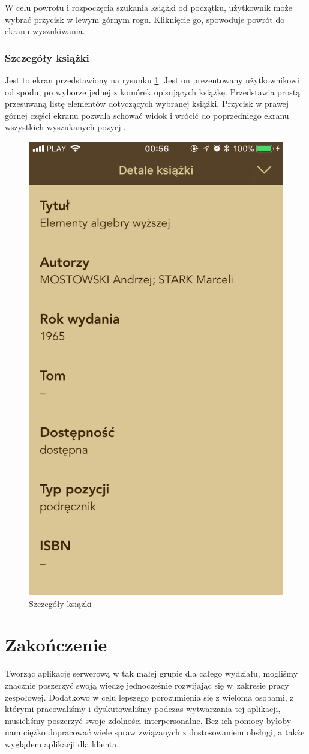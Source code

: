 \documentclass[twoside]{projektInzynierskiMS}
\begin{document}
W celu powrotu i rozpoczęcia szukania książki od początku, użytkownik może wybrać przycisk w lewym górnym rogu. Kliknięcie go, spowoduje powrót do ekranu wyszukiwania.

\subsubsection{Szczegóły książki}

Jest to ekran przedstawiony na rysunku \ref{fig:bookDetails}. Jest on prezentowany użytkownikowi od spodu, po wyborze jednej z komórek opisujących książkę. Przedstawia prostą przesuwaną listę elementów dotyczących wybranej książki. Przycisk w prawej górnej części ekranu pozwala schować widok i wrócić do poprzedniego ekranu wszystkich wyszukanych pozycji.

\begin{figure}[h]
  \centering
  \includegraphics[width=0.4\linewidth]{img/iOS/ios8.png}
  \caption{Szczegóły książki}
  \label{fig:bookDetails}
\end{figure}


\section{Zakończenie}

Tworząc aplikację serwerową w tak małej grupie dla całego wydziału, mogliśmy znacznie poszerzyć swoją wiedzę jednocześnie rozwijając się w~zakresie pracy zespołowej. Dodatkowo w celu lepszego porozumienia się z wieloma osobami, z którymi pracowaliśmy i dyskutowaliśmy podczas wytwarzania tej aplikacji, musieliśmy poszerzyć swoje zdolności interpersonalne. Bez ich pomocy byłoby nam ciężko dopracować wiele spraw związanych z dostosowaniem obsługi, a także wyglądem aplikacji dla klienta.
\end{document}
